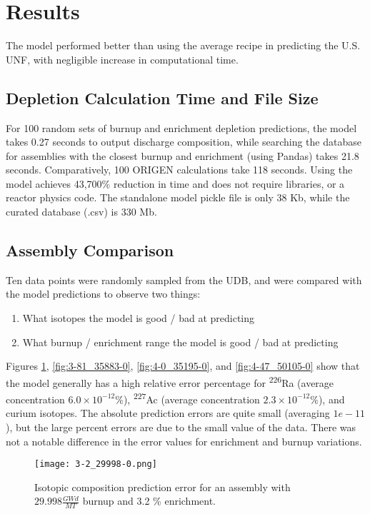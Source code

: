 \section{Results}

The model performed better than using the average
recipe in predicting the U.S. \gls{UNF}, with
negligible increase in computational time.

\subsection{Depletion Calculation Time and File Size}
For 100 random sets of
burnup and enrichment depletion predictions,
the model takes 0.27 seconds to output discharge composition, while
searching the database for assemblies
with the closest burnup and enrichment (using Pandas)
takes 21.8 seconds. Comparatively, 100 \gls{ORIGEN} calculations
take 118 seconds. Using the model achieves 43,700\% reduction
in time and does not require libraries, or a reactor physics code.
The standalone model pickle file is only
38 Kb, while the curated database (.csv) is 330 Mb.

\subsection{Assembly Comparison}

Ten data points were randomly sampled from the \gls{UDB},
and were compared with the model predictions to observe
two things:
\begin{enumerate}
    \item What isotopes the model is good / bad
        at predicting
    \item What burnup / enrichment range the model is good / bad
        at predicting
\end{enumerate}

Figures \ref{fig:3-2_29998-0}, \ref{fig:3-81_35883-0},
\ref{fig:4-0_35195-0}, and \ref{fig:4-47_50105-0}
show that the model
generally has a high relative error percentage for \textsuperscript{226}Ra
(average concentration $6.0\times10^{-12}\%$),
\textsuperscript{227}Ac (average concentration  $2.3\times10^{-12}\%$), and curium isotopes.
The absolute prediction errors are quite small
(averaging $1e-11$), but the large percent errors are due
to the small value of the data. There was not a notable
difference in the error values for enrichment
and burnup variations.

\begin{figure}
    \centering
    \texttt{[image: 3-2\_29998-0.png]}
    \caption{Isotopic composition prediction error for an assembly with 
             $29.998 \frac{GWd}{MT}$ burnup and 3.2  \% enrichment.}
    \label{fig:3-2_29998-0}
\end{figure}

